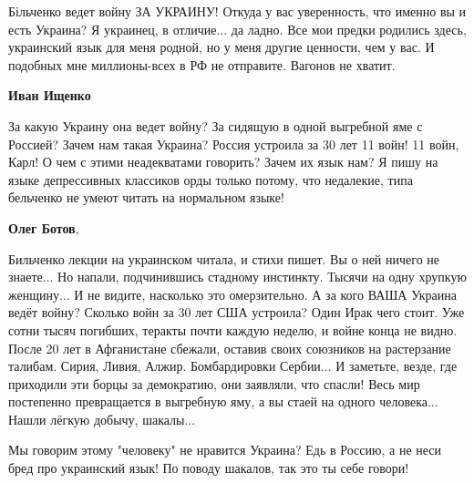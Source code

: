 \begin{itemize}
\begin{itemize}
Більченко ведет войну ЗА УКРАИНУ! Откуда у вас уверенность, что именно вы и есть
Украина? Я украинец, в отличие... да ладно. Все мои предки родились
здесь, украинский язык для меня родной, но у меня другие ценности, чем у вас. И
подобных мне миллионы-всех в РФ не отправите. Вагонов не хватит.


 
\textbf{Иван Ищенко} 

За какую Украину она ведет войну? За сидящую в одной выгребной яме с Россией?
Зачем нам такая Украина? Россия устроила за 30 лет 11 войн! 11 войн, Карл! О
чем с этими неадекватами говорить? Зачем их язык нам? Я пишу на языке
депрессивных классиков орды только потому, что недалекие, типа бельченко не
умеют читать на нормальном языке!

 
\textbf{Олег Ботов}, 

Бильченко лекции на украинском читала, и стихи пишет. Вы о ней ничего не
знаете... Но напали, подчинившись стадному инстинкту. Тысячи на одну хрупкую
женщину... И не видите, насколько это омерзительно. А за кого ВАША Украина ведёт
войну? Сколько войн за 30 лет США устроила? Один Ирак чего стоит. Уже сотни
тысяч погибших, теракты почти каждую неделю, и войне конца не видно. После 20 лет
в Афганистане сбежали, оставив своих союзников на растерзание талибам.
Сирия, Ливия, Алжир. Бомбардировки Сербии... И заметьте, везде, где приходили эти
борцы за демократию, они заявляли, что спасли! Весь мир постепенно превращается в
выгребную яму, а вы стаей на одного человека... Нашли лёгкую добычу, шакалы...


 

Мы говорим этому "человеку" не нравится Украина? Едь в Россию, а не неси бред
про украинский язык! По поводу шакалов, так это ты себе говори!
\end{itemize}


\end{itemize}
